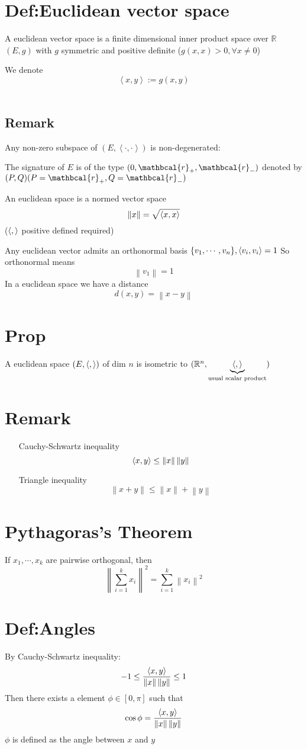 \documentclass{book}
\newcommand{\norm}[1]{\left\lVert #1 \right\rVert}
\begin{document}
\section{Def:Euclidean vector space}
A euclidean vector space is a finite dimensional inner product space over $\mathbb{R}$ $(E,g)$ with $g$ symmetric and positive definite ($g(x,x)>0,\forall x\neq 0$)

We denote$$\left<x,y\right>:=g(x,y)$$\
\subsection*{Remark}
Any non-zero subspace of $(E,\left<\cdot,\cdot\right>)$ is non-degenerated:

The signature of $E$ is of the type $(0,\mathbcal{r}_+,\mathbcal{r}_-)$ denoted by $(P,Q)(P=\mathbcal{r}_+,Q=\mathbcal{r}_-)$

An euclidean space is a normed vector space $$\norm{x}=\sqrt{\inprod{x}{x}}$$
($\left<,\right>$ positive defined required)

Any euclidean vector admits an orthonormal basis $\{v_1,\cdots,v_n\},\left<v_i,v_i\right>=1$ So orthonormal means $$\norm{v_1}=1$$
In a euclidean space we have a distance $$d(x,y)=\norm{x-y}$$
\section{Prop}
A euclidean space $(E,\left<,\right>)$ of dim $n$ is isometric to $(\mathbb{R}^n,\underbrace{\left<,\right>}\limits_{\text{usual scalar product}})$
\section{Remark}
\begin{itemize}
    \item [Cauchy-Schwartz inequality]$$\inprod{x}{y}\leq\norm{x}\norm{y}$$
    \item [Triangle inequality]$$\norm{x+y}\leq\norm{x}+\norm{y}$$
\end{itemize}
\section{Pythagoras's Theorem}
\label{Pythagoras}
If $x_1,\cdots,x_k$ are pairwise orthogonal, then
$$\norm{\sum\limits_{i=1}^kx_i}^2=\sum\limits_{i=1}^k\norm{x_i}^2$$
\section{Def:Angles}
By Cauchy-Schwartz inequality:
$$-1\leq\frac{\inprod{x}{y}}{\norm{x}\norm{y}}\leq1$$
Then there exists a element $\phi\in [0,\pi]$ such that
$$\cos\phi=\frac{\inprod{x}{y}}{\norm{x}\norm{y}}$$
$\phi$ is defined as the angle between $x$ and $y$
\end{document}
